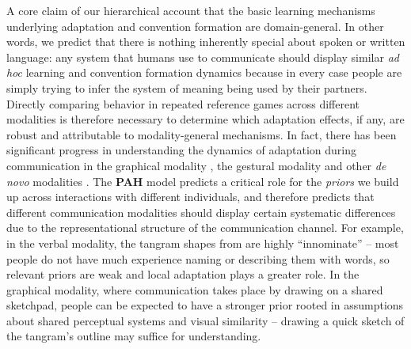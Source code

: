 A core claim of our hierarchical account that the basic learning mechanisms underlying adaptation and convention formation are domain-general.
In other words, we predict that there is nothing inherently special about spoken or written language: any system that humans use to communicate should display similar \emph{ad hoc} learning and convention formation dynamics because in every case people are simply trying to infer the system of meaning being used by their partners. Directly comparing behavior in repeated reference games across different modalities is therefore necessary to determine which adaptation effects, if any, are robust and attributable to modality-general mechanisms.
In fact, there has been significant progress in understanding the dynamics of adaptation during communication in the  graphical modality \cite{GarrodFayLeeOberlanderMacLeod07_GraphicalSymbolSystems,TheisenEtAl10_SystematicityArbitrariness,hawkins2019disentangling}, the gestural modality \cite{FayListerEllisonGoldinMeadow13_GestureBeatsVocalization,motamedi2019evolving,bohn2019young} and other \emph{de novo} modalities \cite{Galantucci05_EmergenceOfCommunication,RobertsGalantucci12_DualityOfPatterning,RobertsEtAl15_IconocityOnCombinatoriality,VerhoefRobertsDingemanse15_Iconicity,VerhoefEtAl16_TemporalLanguage,kempe2019adults}.
The \textbf{PAH} model predicts a critical role for the \emph{priors} we build up across interactions with different individuals, and therefore predicts that different communication modalities should display certain systematic differences due to the representational structure of the communication channel.
For example, in the verbal modality, the tangram shapes from  are highly ``innominate'' %
\cite{HupetEtAl91_CodabilityReference} -- most people do not have much experience naming or describing them with words, so relevant priors are weak and local adaptation plays a greater role.
In the graphical modality, where communication takes place by drawing on a shared sketchpad, people can be expected to have a stronger prior rooted in assumptions about shared perceptual systems and visual similarity \cite{fan2018common} -- drawing a quick sketch of the tangram's outline may suffice for understanding.

